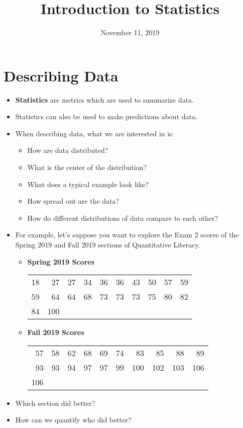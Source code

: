 \documentclass{article}
\title{Introduction to Statistics}
\date{November 11, 2019}
\begin{document}
\maketitle

\section{Describing Data}
\begin{itemize}
    \item \textbf{Statistics} are metrics which are used to summarize data.
    \item Statistics can also be used to make predictions about data.
    \item When describing data, what we are interested in is:
    \begin{itemize}
        \item How are data distributed?
        \item What is the center of the distribution?
        \item What does a typical example look like?
        \item How spread out are the data?
        \item How do different distributions of data compare to each other?
    \end{itemize}
    \item For example, let's suppose you want to explore the Exam 2 scores of the 
        Spring 2019 and Fall 2019 sections of Quantitative Literacy.
        \begin{itemize}
            \item \textbf{Spring 2019 Scores}
            \newline\begin{tabular}{rrrrrrrrrr}
            18 & 27 & 27 & 34 & 36 & 36 & 43 & 50 & 57 & 59\\
            59 & 64 & 64 & 68 & 73 & 73 & 73 & 75 & 80 & 82\\
            84 & 100\\
            \end{tabular}

            \item \textbf{Fall 2019 Scores}
            \newline\begin{tabular}{rrrrrrrrrr}
            57 & 58 & 62 & 68 & 69 & 74 & 83 & 85 & 88 & 89 \\
            93 & 93 & 94 & 97 & 97 & 99 & 100 & 102 & 103 & 106\\
            106 \\
            \end{tabular}
        \end{itemize}
    \item Which section did better?
    \item How can we quantify who did better?
\end{itemize}
\end{document}
